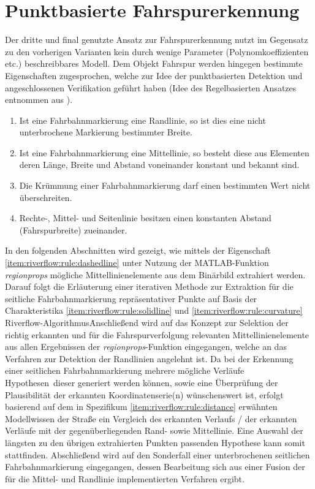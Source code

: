 \section{Punktbasierte Fahrspurerkennung \dcsecondauthorshort} 
\label{sec:fahrspurerkennung:riverflow}

Der dritte und final genutzte Ansatz zur Fahrspurerkennung nutzt im Gegensatz zu den vorherigen Varianten kein durch wenige Parameter (Polynomkoeffizienten etc.) beschreibbares Modell. Dem Objekt Fahrspur werden hingegen bestimmte Eigenschaften zugesprochen, welche zur Idee der punktbasierten Detektion und angeschlossenen Verifikation geführt haben (Idee des Regelbasierten Ansatzes entnommen aus \autocite[35-39]{drauschkeEchtzeitfaehigeStartpunktalgorithmenFuer2016}).
\begin{enumerate}
\item \label{item:riverflow:rule:solidline}
Ist eine Fahrbahnmarkierung eine Randlinie, so ist dies eine nicht unterbrochene Markierung bestimmter Breite.
\item \label{item:riverflow:rule:dashedline}
Ist eine Fahrbahnmarkierung eine Mittellinie, so besteht diese aus Elementen deren Länge, Breite und Abstand voneinander konstant und bekannt sind.
\item \label{item:riverflow:rule:curvature}
Die Krümmung einer Fahrbahnmarkierung darf einen bestimmten Wert nicht überschreiten.
\item \label{item:riverflow:rule:distance}
Rechte-, Mittel- und Seitenlinie besitzen einen konstanten Abstand (Fahrspurbreite) zueinander.
\end{enumerate}
In den folgenden Abschnitten wird gezeigt, wie mittels der Eigenschaft \ref{item:riverflow:rule:dashedline} unter Nutzung der MATLAB-Funktion \emph{regionprops} mögliche Mittellinienelemente aus dem Binärbild extrahiert werden. Darauf folgt die Erläuterung einer iterativen Methode zur Extraktion für die seitliche Fahrbahnmarkierung repräsentativer Punkte auf Basis der Charakteristika \ref{item:riverflow:rule:solidline} und \ref{item:riverflow:rule:curvature} \glqq Riverflow-Algorithmus\grqq\. Anschließend wird auf das Konzept zur Selektion der richtig erkannten und für die Fahrspurverfolgung relevanten Mittellinienelemente aus allen Ergebnissen der \emph{regionprops}-Funktion eingegangen, welche an das Verfahren zur Detektion der Randlinien angelehnt ist. Da bei der Erkennung einer seitlichen Fahrbahnmarkierung mehrere mögliche Verläufe \glqq Hypothesen\grqq\ dieser generiert werden können, sowie eine Überprüfung der Plausibilität der erkannten Koordinatenserie(n) wünschenswert ist, erfolgt basierend auf dem in Spezifikum \ref{item:riverflow:rule:distance} erwähnten Modellwissen der Straße ein Vergleich des erkannten Verlaufs / der erkannten Verläufe mit der gegenüberliegenden Rand- sowie Mittellinie. Eine Auswahl der längsten zu den übrigen extrahierten Punkten passenden Hypothese kann somit stattfinden. Abschließend wird auf den Sonderfall einer unterbrochenen seitlichen Fahrbahnmarkierung eingegangen, dessen Bearbeitung sich aus einer Fusion der für die Mittel- und Randlinie implementierten Verfahren ergibt.




